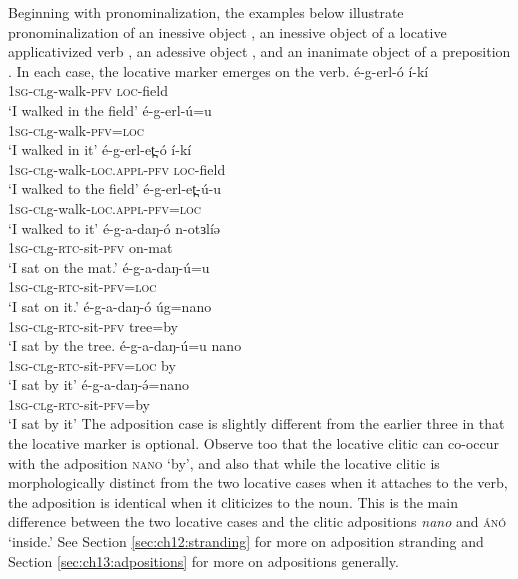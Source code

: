 Beginning with pronominalization, the examples below illustrate pronominalization of an inessive object , an inessive object of a locative applicativized verb  , an adessive object , and an inanimate object of a preposition . In each case, the locative marker emerges on the verb.
\ea \label{ex:ch11:locadj}
	\ea \gll é-g-erl-ó í-kí\\
			 \textsc{1sg-cl}g-walk-\textsc{pfv} \textsc{loc}-field\\
		\glt `I walked in the field'
	\ex \gll é-g-erl-ú=u  \\
			\textsc{1sg-cl}g-walk-\textsc{pfv}=\textsc{loc}\\ 
		\glt `I walked in it'
	\z 
\ex \label{ex:ch11:iness}
	\ea \gll é-g-erl-et̪-ó í-kí\\
			 \textsc{1sg-cl}g-walk-\textsc{loc.appl}-\textsc{pfv} \textsc{loc}-field \\
		\glt `I walked to the field'
	\ex \gll é-g-erl-et̪-ú-u \\
		\textsc{1sg-cl}g-walk-\textsc{loc.appl}-\textsc{pfv}=\textsc{loc} \\
		\glt `I walked to it'
	\z 
\ex \label{ex:ch11:adess}
	\ea \gll é-g-a-daŋ-ó n-otɜlíə		\\	
			\textsc{1sg}-\textsc{cl}g-\textsc{rtc}-sit-\textsc{pfv} on-mat \\
		\glt `I sat on the mat.'
	\ex \gll é-g-a-daŋ-ú=u\\
			\textsc{1sg}-\textsc{cl}g-\textsc{rtc}-sit-\textsc{pfv}=\textsc{loc}\\
		\glt `I sat on it.'
	\z 
\ex \label{ex:ch11:adposition}
	\ea \gll é-g-a-daŋ-ó úg=nano		\\	
			\textsc{1sg}-\textsc{cl}g-\textsc{rtc}-sit-\textsc{pfv} tree=by \\
		\glt `I sat by the tree.
	\ex \gll é-g-a-daŋ-ú=u nano\\
			\textsc{1sg}-\textsc{cl}g-\textsc{rtc}-sit-\textsc{pfv}=\textsc{loc} by\\
		\glt `I sat by it'
	\ex \gll é-g-a-daŋ-ə́=nano\\
			\textsc{1sg}-\textsc{cl}g-\textsc{rtc}-sit-\textsc{pfv}=by\\
		\glt `I sat by it'
	\z 
\z 
The adposition case is slightly different from the earlier three in that the locative marker is optional. Observe too that the locative clitic can co-occur with the adposition \textsc{nano} `by', and also that while the locative clitic is morphologically distinct from the two locative cases when it attaches to the verb, the adposition is identical when it cliticizes to the noun. This is the main difference between the two locative cases and the clitic adpositions \textit{nano} and \textsc{ánó} `inside.' See Section \ref{sec:ch12:stranding} for more on adposition stranding and Section \ref{sec:ch13:adpositions} for more on adpositions generally.

